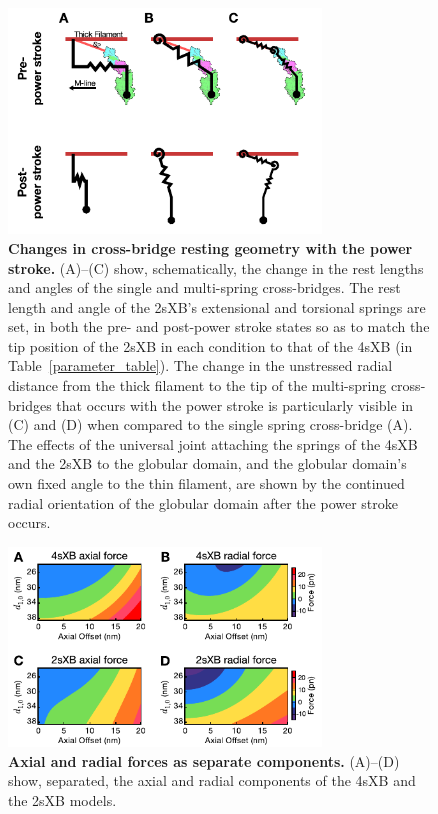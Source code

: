 \documentclass[10pt]{article}
\begin{document}
\clearpage
\begin{figure}[ht]
    \begin{center}
    \includegraphics[width=8.3cm]{../imgs/FigureS2.pdf}
    \caption{ \textbf{Changes in cross-bridge resting geometry with the power stroke.}
        (A)--(C) show, schematically, the change in the rest lengths and angles of the single and multi-spring cross-bridges. 
        The rest length and angle of the 2sXB's extensional and torsional springs are set, in both the pre- and post-power stroke states so as to match the tip position of the 2sXB in each condition to that of the 4sXB (in Table~\ref{parameter_table}).
        The change in the unstressed radial distance from the thick filament to the tip of the multi-spring cross-bridges that occurs with the power stroke is particularly visible in (C) and (D) when compared to the single spring cross-bridge (A).
        The effects of the universal joint attaching the springs of the 4sXB and the 2sXB to the globular domain, and the globular domain's own fixed angle to the thin filament, are shown by the continued radial orientation of the globular domain after the power stroke occurs.
        \label{fig_power_stroke_changes}
           }
    \end{center}
\end{figure}

\clearpage
\begin{figure}[ht]
    \begin{center}
    \includegraphics[width=8.3cm]{../imgs/FigureS3.pdf}
    \caption{ \textbf{Axial and radial forces as separate components.}
        (A)--(D) show, separated, the axial and radial components of the 4sXB and the 2sXB models.
        \label{fig_force_contours}
           }
    \end{center}
\end{figure}
\end{document}
